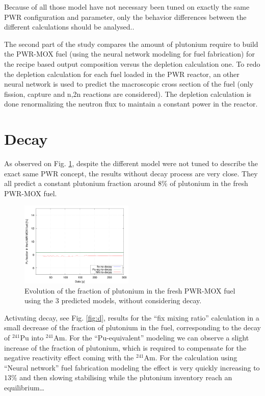 \documentclass{anstrans}
\begin{document}
Because of all those model have not necessary been tuned on exactly the same
PWR configuration and parameter, only the behavior differences between the
different calculations should be analysed..


The second part of the study compares the amount of plutonium require to build
the PWR-MOX fuel (using the neural network modeling for fuel fabrication) for
the recipe based output composition versus the depletion calculation one.
To redo the depletion calculation for each fuel loaded in the PWR reactor, an
other neural network is used to predict the macroscopic cross section of the
fuel \cite{Leniau2015125} (only fission, capture and n,2n reactions are considered). The
depletion calculation is done renormalizing the neutron flux to maintain a
constant power in the reactor.


\section{Decay}


As observed on Fig. \ref{fig:nod}, despite the different model were not tuned to
describe the exact same PWR concept, the results without decay process are very
close. They all predict a constant plutonium fraction around $8\%$ of plutonium
in the fresh PWR-MOX fuel.

\begin{figure}[ht] %
  \centering
  \includegraphics[width=0.48\textwidth]{nodecay_pu_contribution.png}
  \caption{Evolution of the fraction of plutonium in the fresh PWR-MOX fuel
  using the 3 predicted models, without considering decay.}
  \label{fig:nod}
\end{figure}


Activating decay, see Fig. \ref{fig:d}, results for the ``fix mixing ratio''
calculation in a small decrease of the fraction of plutonium in the fuel,
corresponding to the decay of $^{241}$Pu into $^{241}$Am. For the
``Pu-equivalent'' modeling we can observe a slight increase of the fraction of
plutonium, which is required to compensate for the negative reactivity effect
coming with the $^{241}$Am. For the calculation using ``Neural network'' fuel
fabrication modeling the effect is very quickly increasing to $13\%$ and then
slowing stabilising while the plutonium inventory reach an equilibrium\ldots
\end{document}
